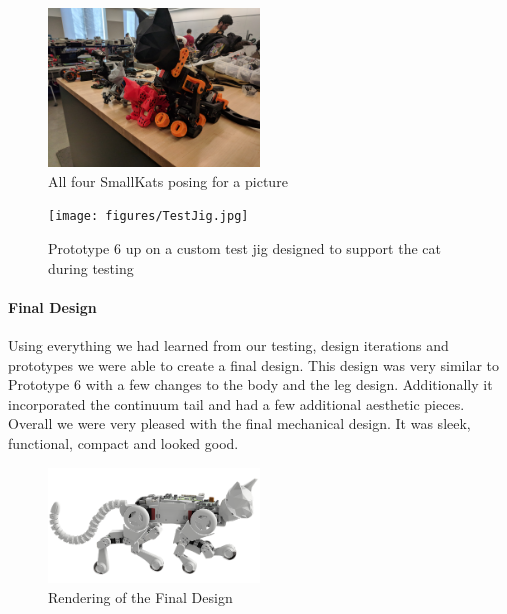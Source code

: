         \begin{figure}[H]
                \centering
                \includegraphics[width=0.5\textwidth]{figures/SmallKats.jpg}
                \caption{All four SmallKats posing for a picture}
                \label{fig:SmallKats}
        \end{figure}  
        
        \begin{figure}[H]
                \centering
                \texttt{[image: figures/TestJig.jpg]}
                \caption{Prototype 6 up on a custom test jig designed to support the cat during testing}
                \label{fig:TestJig}
        \end{figure} 


        \paragraph{Final Design}
        Using everything we had learned from our testing, design iterations and prototypes we were able to create a final design. This design was very similar to Prototype 6 with a few changes to the body and the leg design. Additionally it incorporated the continuum tail and had a few additional aesthetic pieces. Overall we were very pleased with the final mechanical design. It was sleek, functional, compact and looked good. 
         
         \begin{figure}[H]
                \centering
                \includegraphics[width=0.5\textwidth]{figures/FinalDesign.png}
                \caption{Rendering of the Final Design}
                \label{fig:FinalDesign}
        \end{figure} 

